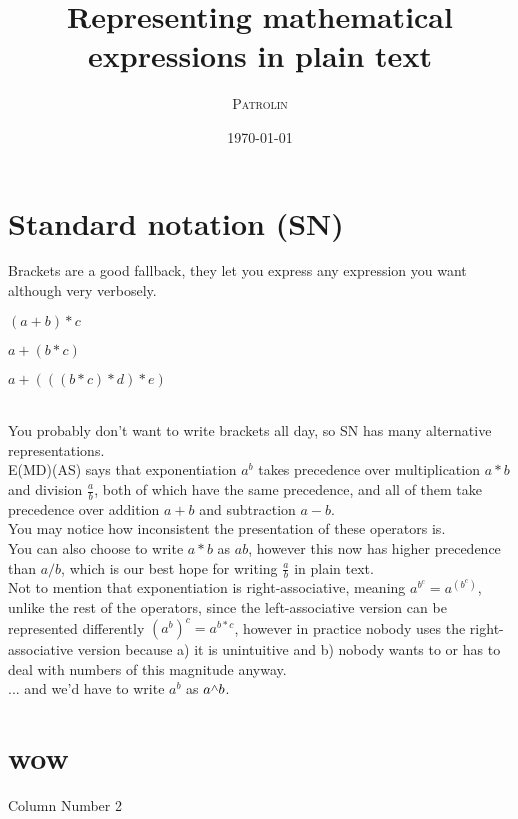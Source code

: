 \documentclass[twoside]{article}
\title{Representing mathematical expressions in plain text}
\author{\textsc{Patrolin}}
\date{\today}
\newcommand{\B}[1]{\left(#1\right)} %
\newcommand{\F}[2]{\frac{#1}{#2}} %
\newcommand{\caret}{\raisebox{0.5ex}{$\scriptstyle\wedge$}}
\begin{document}
    \maketitle
    \thispagestyle{empty}

    \begin{multicols}{2}
        \section{Standard notation (SN)}
            Brackets are a good fallback, they let you express any expression you want although very verbosely.\\
            \centerline{$ (a + b) * c $}
            \centerline{$ a + (b * c) $}
            \centerline{$ a + (((b * c) * d) * e) $}
            \vspace{8px}\\
            You probably don't want to write brackets all day, so SN has many alternative representations.\\
            E(MD)(AS) says that exponentiation $a^b$ takes precedence over multiplication $a*b$ and division $\F{a}{b}$, both of which have the same precedence,
            and all of them take precedence over addition $a+b$ and subtraction $a-b$.
            \vspace{15px}\\
            You may notice how inconsistent the presentation of these operators is.\\
            You can also choose to write $a*b$ as $ab$, however this now has higher precedence than $a/b$, which is our best hope for writing $\F{a}{b}$ in plain text.
            \vspace{15px}\\
            Not to mention that exponentiation is right-associative, meaning $a^{b^c} = a^{\B{b^c}}$, unlike the rest of the operators,
            since the left-associative version can be represented differently $(a^b)^c = a^{b*c}$,
            however in practice nobody uses the right-associative version because a) it is unintuitive and b) nobody wants to or has to deal with numbers of this magnitude anyway.\\
            ... and we'd have to write $a^b$ as $a\caret{}b$.
        \columnbreak
        \section{wow}
            Column Number 2
    \end{multicols}
\end{document}
